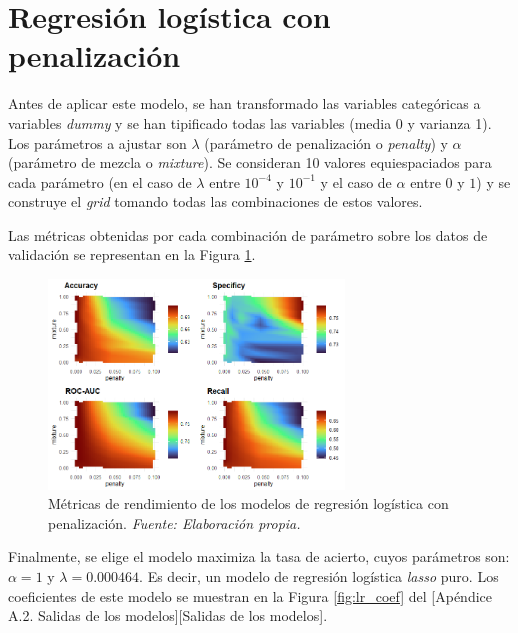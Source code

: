\documentclass[12pt,a4paper,]{book}
\newcounter{dummy}
\numberwithin{dummy}{section}
\theoremstyle{ocrenumbox}
\theoremstyle{blacknumex}
\theoremstyle{blacknumbox}
\theoremstyle{ocrenum}
\theoremstyle{ocrenum}
\begin{document}
\hypertarget{regresiuxf3n-loguxedstica-con-penalizaciuxf3n}{%
\section{Regresión logística con
penalización}\label{regresiuxf3n-loguxedstica-con-penalizaciuxf3n}}

Antes de aplicar este modelo, se han transformado las variables
categóricas a variables \emph{dummy} y se han tipificado todas las
variables (media 0 y varianza 1). Los parámetros a ajustar son
\(\lambda\) (parámetro de penalización o \emph{penalty}) y \(\alpha\)
(parámetro de mezcla o \emph{mixture}). Se consideran 10 valores
equiespaciados para cada parámetro (en el caso de \(\lambda\) entre
\(10^{-4}\) y \(10^{-1}\) y el caso de \(\alpha\) entre \(0\) y \(1\)) y
se construye el \emph{grid} tomando todas las combinaciones de estos
valores.

Las métricas obtenidas por cada combinación de parámetro sobre los datos
de validación se representan en la Figura \ref{fig:lr_tuningplot}.

\begin{figure}[h!]
\centering
\includegraphics[width =0.7\textwidth]{graficos/lr_tuningplot.png}
\caption[Métricas de rendimiento de los modelos de regresión logística con penalización]{Métricas de rendimiento de los modelos de regresión logística con penalización.  \it Fuente: Elaboración propia.}
\label{fig:lr_tuningplot}
\end{figure}

Finalmente, se elige el modelo maximiza la tasa de acierto, cuyos
parámetros son: \(\alpha= 1\) y \(\lambda = 0.000464\). Es decir, un
modelo de regresión logística \emph{lasso} puro. Los coeficientes de
este modelo se muestran en la Figura \ref{fig:lr_coef} del {[}Apéndice
A.2. Salidas de los modelos{]}{[}Salidas de los modelos{]}.
\end{document}
